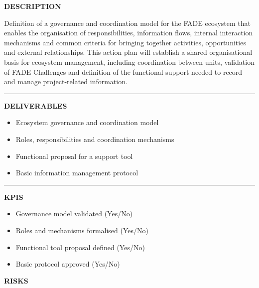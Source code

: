 \documentclass[11pt,a4paper]{scrreprt}
\newcommand{\fieldlabel}[1]{%
  {\footnotesize\sffamily\bfseries\color{mutedcolor}\MakeUppercase{#1}}\par\nopagebreak[4]
}
\newcommand{\fieldsep}{\vspace{3pt}\noindent\textcolor{bordercolor}{\rule{\linewidth}{0.4pt}}\vspace{3pt}\par}
\begin{document}
\begin{tcolorbox}[pabox={filcolor}{A.P.1.3 \enspace\textbullet\enspace Definition of the Governance and Coordination Model of the FADE Ecosystem}]

\fieldlabel{Description}
{\small Definition of a governance and coordination model for the FADE ecosystem that enables the organisation of responsibilities, information flows, internal interaction mechanisms and common criteria for bringing together activities, opportunities and external relationships. This action plan will establish a shared organisational basis for ecosystem management, including coordination between units, validation of FADE Challenges and definition of the functional support needed to record and manage project-related information. }\par
\fieldsep
\fieldlabel{Deliverables}
{\small \begin{itemize}[noitemsep,topsep=2pt]
\item Ecosystem governance and coordination model
\item Roles, responsibilities and coordination mechanisms
\item Functional proposal for a support tool
\item Basic information management protocol
\end{itemize}}\par
\fieldsep
\fieldlabel{KPIs}
{\small \begin{itemize}[noitemsep,topsep=2pt]
\item Governance model validated (Yes/No)
\item Roles and mechanisms formalised (Yes/No)
\item Functional tool proposal defined (Yes/No)
\item Basic protocol approved (Yes/No)
\end{itemize}}\par
\end{tcolorbox}
\begin{tcolorbox}[riskbox]
{\footnotesize\sffamily\bfseries\color{red!50!black} RISKS}\par{}
\end{tcolorbox}
\end{document}
